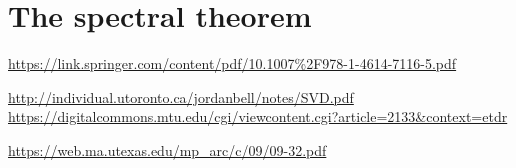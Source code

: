 \section{The spectral theorem}
\url{https://link.springer.com/content/pdf/10.1007%2F978-1-4614-7116-5.pdf}

\url{http://individual.utoronto.ca/jordanbell/notes/SVD.pdf}
\url{https://digitalcommons.mtu.edu/cgi/viewcontent.cgi?article=2133&context=etdr}

\url{https://web.ma.utexas.edu/mp_arc/c/09/09-32.pdf}


